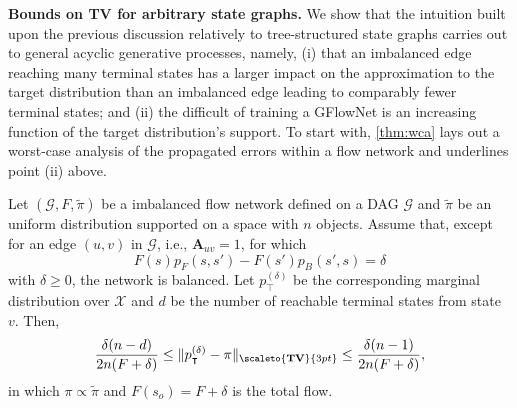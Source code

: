 \vspace{4pt}\noindent\textbf{Bounds on TV for arbitrary state graphs.} We show that the intuition built upon the previous discussion relatively to tree-structured state graphs carries out to general acyclic generative processes, namely, (i) that an imbalanced edge reaching many terminal states has a larger impact on the approximation to the target distribution than an imbalanced edge leading to comparably fewer terminal states; and (ii) the difficult of training a GFlowNet is an increasing function of the target distribution's support. To start with, \autoref{thm:wca} lays out a worst-case analysis of the propagated errors within a flow network and underlines point (ii) above. 

\begin{theorem} \label{thm:wca} 
    Let $(\mathcal{G}, F, \tilde{\pi})$ be a imbalanced flow network defined on a DAG $\mathcal{G}$ and $\tilde{\pi}$ be an uniform distribution supported on a space with $n$ objects. Assume that, except for an edge $(u, v)$ in $\mathcal{G}$, i.e., $\mathbf{A}_{uv} = 1$, for which  
    \begin{equation}
        F(s) p_{F}(s, s') - F(s') p_{B}(s', s) = \delta 
    \end{equation}
    with $\delta \ge 0$, the network is balanced. Let $p_{\intercal}^{(\delta)}$ be the corresponding marginal distribution over $\mathcal{X}$ and $d$ be the number of reachable terminal states from state $v$. Then, 
    \begin{equation}
        \frac{\delta (n - d)}{2n (F + \delta)} \le \|p_{\intercal}^{(\delta)} - \pi\|_{\scaleto{\textbf{TV}}{3pt}} \le \frac{\delta (n - 1)}{2n (F + \delta)}, 
    \end{equation}
    in which $\pi \propto \tilde{\pi}$ and $F(s_{o}) = F + \delta$ is the total flow. 
\end{theorem}


